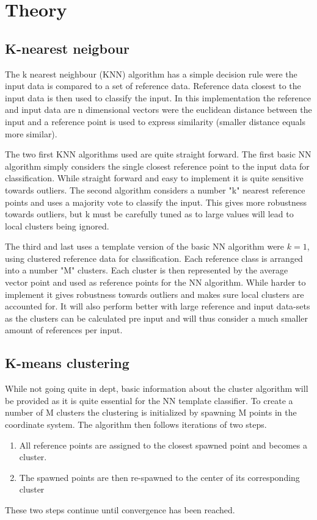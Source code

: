 \documentclass{article}
\begin{document}
\section{Theory}
\subsection{K-nearest neigbour}
The k nearest neighbour (KNN) algorithm has a simple decision rule were the input data is compared to a set of reference data. Reference data closest to the input data is then used to classify the input. \cite{Compendium in classification for TTT4275} In this implementation the reference and input data are n dimensional vectors were the euclidean distance between the input and a reference point is used to express similarity (smaller distance equals more similar).

The two first KNN algorithms used are quite straight forward. The first basic NN algorithm simply considers the single closest reference point to the input data for classification. While straight forward and easy to implement it is quite sensitive towards outliers.
The second algorithm considers a number "k" nearest reference points and uses a majority vote to classify the input. This gives more robustness towards outliers, but k must be carefully tuned as to large values will lead to local clusters being ignored.

The third and last uses a template version of the basic NN algorithm were $k = 1$, using clustered reference data for classification. Each reference class is arranged into a number "M" clusters. Each cluster is then represented by the average vector point and used as reference points for the NN algorithm. While harder to implement it gives robustness towards outliers and makes sure local clusters are accounted for. It will also perform better with large reference and input data-sets as the clusters can be calculated pre input and will thus consider a much smaller amount of references per input.

\subsection{K-means clustering}
While not going quite in dept, basic information about the cluster algorithm will be provided as it is quite essential for the NN template classifier. To create a number of M clusters the clustering is initialized by spawning M points in the coordinate system. The algorithm then follows iterations of two steps.
\begin{enumerate}

    \item All reference points are assigned to the closest spawned point and becomes a cluster.
    \item The spawned points are then re-spawned to the center of its corresponding cluster
\end{enumerate}
These two steps continue until convergence has been reached.
\end{document}
